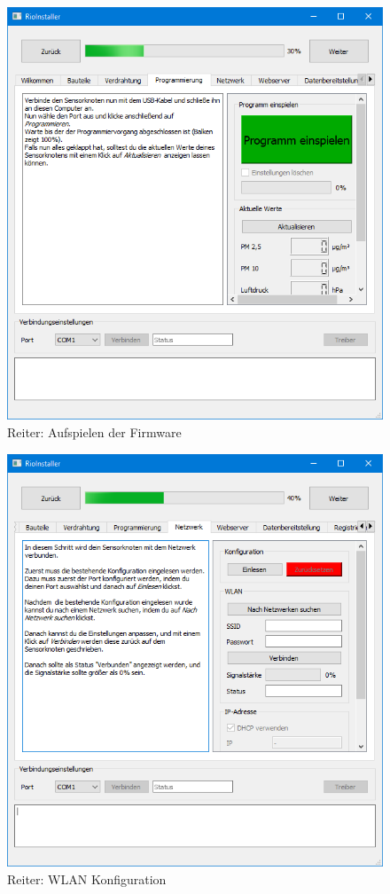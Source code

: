 \begin{figure}[H]
	\centering
	\includegraphics[width=\textwidth]{./ressourcen/Programmierung_neu.png}
	\caption{Reiter: Aufspielen der Firmware}
	\label{fig:skItoolOldFirmware}
\end{figure}

\begin{figure}[H]
	\centering
	\includegraphics[width=\textwidth]{./ressourcen/Netzwerk_neu.png}
	\caption{Reiter: WLAN Konfiguration}
	\label{fig:skItoolOldWifi}
\end{figure}

